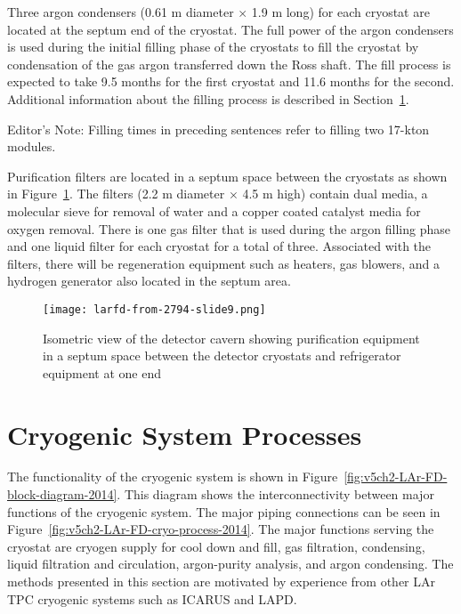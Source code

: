 Three argon condensers (0.61 m diameter $\times$ 1.9 m long) for each cryostat are located at the
septum end of the cryostat. The full power of the argon condensers is used during the initial
filling phase of the cryostats to fill the cryostat by condensation of the gas argon transferred
down the Ross shaft. The fill process is expected to take 9.5 months for the first cryostat and
11.6 months for the second. Additional information about the filling process is described in
Section~\ref{sec:cryo-sys-proc}.  

\begin{editornote}
  Editor's Note:  Filling times in preceding sentences refer to filling two 17-kton modules.
\end{editornote}


Purification filters are located in a septum space between the cryostats as shown in Figure~\ref{fig:det-cavern-purif}. The filters (2.2 m
diameter $\times$ 4.5 m high) contain dual media, a molecular sieve for removal of water and a copper
coated catalyst media for oxygen removal. There is one gas filter that is used during the argon
filling phase and one liquid filter for each cryostat for a total of three. Associated with the
filters, there will be regeneration equipment such as heaters, gas blowers, and a hydrogen
generator also located in the septum area. 

\begin{figure}[htbp]
\centering
\texttt{[image: larfd-from-2794-slide9.png]} 
\caption{Isometric view of the detector cavern showing purification equipment in a septum
space between the detector cryostats and refrigerator equipment at one end}
\label{fig:det-cavern-purif}
\end{figure}


\section{Cryogenic System Processes}
\label{sec:cryo-sys-proc}
The functionality of the cryogenic system is
shown in Figure~\ref{fig:v5ch2-LAr-FD-block-diagram-2014}. This diagram shows
the interconnectivity between major functions of the cryogenic system. The major piping
connections can be seen in Figure~\ref{fig:v5ch2-LAr-FD-cryo-process-2014}. The major functions serving the
cryostat are cryogen supply for cool down and fill, gas
filtration, condensing, liquid filtration and circulation, argon-purity analysis, and argon condensing. The methods presented in this section are motivated by
experience from other LAr TPC cryogenic systems such as ICARUS and LAPD.

